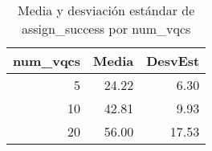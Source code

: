 \begin{table}
\caption{Media y desviación estándar de assign\_success por num_vqcs}
\label{tab:num_vqcs-stats}
\begin{tabular}{rrr}
\toprule
num_vqcs & Media & DesvEst \\
\midrule
5 & 24.22 & 6.30 \\
10 & 42.81 & 9.93 \\
20 & 56.00 & 17.53 \\
\bottomrule
\end{tabular}
\end{table}
